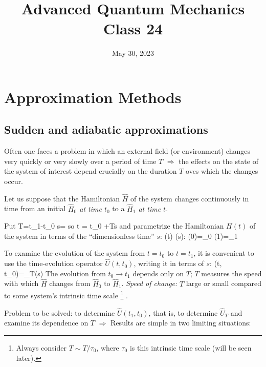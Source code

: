 \documentclass[12pt]{article}
\title{Advanced Quantum Mechanics\\Class 24}
\date{May 30, 2023}                                           %
\begin{document}
\maketitle

\setcounter{section}{4}

\section{Approximation Methods}


\setcounter{subsection}{2}
\subsection{Sudden and adiabatic approximations}

Often one faces a problem in which an
external field (or environment) changes
very quickly or very slowly over a
period of time $T$
$\Rightarrow$
the effects on the state of the system of
interest depend crucially on the
duration $T$ oves which the changes occur.

Let us suppose that the Hamiltonian $\hat{H}$ of the
system changes continuously in time from an
initial \emph{$\hat{H}_{0}$ at time $t_{0}$} to a \emph{$\hat{H}_{1}$ at time $t$}.

Put
\be
T=t_{1}-t_{0}  s=
\ee
so
\be
t = t_0  +Ts
\ee
and parametrize the Hamiltonian $H(t)$ of the system
in terms of the ``dimensionless time'' $s$:
\be
{}(t) \rightarrow {}(s): (0)=_{0}  (1)=_{1}
\ee


To examine the evolution of the system from $t=t_{0}$
to $t=t_{1}$, it is convenient to use the time-evolution
operator $\hat{U}\left(t, t_{0}\right)$, writing it in terms of $s$:
\be
{}\left(t, t_{0}\right)=_{T}(s)
\ee
The evolution from $t_{0} \rightarrow t_{1}$ depends only on $T$;
$T$ measures the speed with which $\hat{H}$ changes from $\hat{H}_{0}$ to $\hat{H}_{1}$.
\emph{Speed of change:} $T$ large or small compared to some
system's intrinsic time scale%
\footnote{Always consider $T\sim T/\tau_0$, where $\tau_0$ is this intrinsic time scale (will be seen later).}%
.

Problem to be solved: to determine $\hat{U}\left(t_{1}, t_{0}\right)$,
that is, to determine $\hat{U}_{T}$ and examine its dependence on $T$
$\Rightarrow$ Results are simple in two limiting situations:
\end{document}
